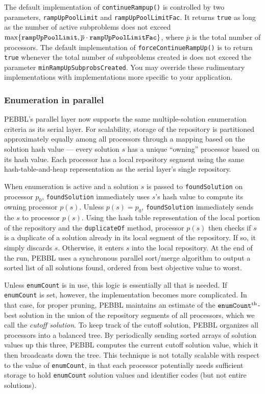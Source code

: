 The default implementation of \texttt{continueRampup()} is controlled
by two parameters, \texttt{ramp\linebreak[0]UpPoolLimit} and
\texttt{rampUpPoolLimitFac}.  It returns \texttt{true} as long as the
number of active subproblems does not exceed $\max\{\mbox{\tt
rampUpPoolLimit}, \overline{p}\cdot\mbox{\tt rampUpPoolLimitFac}\}$,
where $\overline{p}$ is the total number of processors.  The default
implementation of \texttt{forceContinueRampUp()} is to return
\texttt{true} whenever the total number of subproblems created is does
not exceed the parameter \texttt{minRampUpSubprobsCreated}.  You may
override these rudimentary implementations with implementations more
specific to your application.


\subsubsection{Enumeration in parallel}

PEBBL's parallel layer now supports the same multiple-solution
enumeration criteria as its serial layer.  For scalability, storage of
the repository is partitioned approximately equally among all
processors through a mapping based on the solution hash value ---
every solution $s$ has a unique ``owning'' processor based on its hash
value.  Each processor has a local repository segment using the same
hash-table-and-heap representation as the serial layer's single
repository.

When enumeration is active and a solution $s$ is passed to
\texttt{foundSolution} on processor $p_0$, \texttt{foundSolution}
immediately uses $s$'s hash value to compute its owning processor
$p(s)$.  Unless $p(s)=p_0$, \texttt{foundSolution} immediately sends
the $s$ to processor $p(s)$.  Using the hash table representation of
the local portion of the repository and the \texttt{duplicateOf}
method, processor $p(s)$ then checks if $s$ is a duplicate of a
solution already in its local segment of the repository.  If so, it
simply discards $s$.  Otherwise, it enters $s$ into the local
repository.  At the end of the run, PEBBL uses a synchronous parallel
sort/merge algorithm to output a sorted list of all solutions found,
ordered from best objective value to worst.

Unless \texttt{enumCount} is in use, this logic is essentially all
that is needed.  If \texttt{enumCount} is set, however, the
implementation becomes more complicated.  In that case, for proper
pruning, PEBBL maintains an estimate of the
$\text{\texttt{enumCount}}^{\text{th}}$-best solution in the union of
the repository segments of all processors, which we call the
\emph{cutoff solution}.  To keep track of the cutoff solution, PEBBL
organizes all processors into a balanced tree.  By periodically
sending sorted arrays of solution values up this three, PEBBL computes
the current cutoff solution value, which it then broadcasts down the
tree.  This technique is not totally scalable with respect to the
value of \texttt{enumCount}, in that each processor potentially needs
sufficient storage to hold \texttt{enumCount} solution values and
identifier codes (but not entire solutions).



